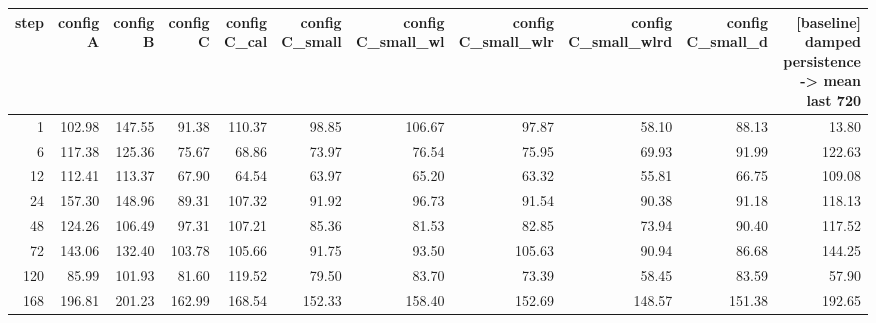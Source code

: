 \begin{tabular}{rrrrrrrrrrr}
\toprule
step & config A & config B & config C & config C\_cal & config C\_small & config C\_small\_wl & config C\_small\_wlr & config C\_small\_wlrd & config C\_small\_d & [baseline] damped persistence -> mean last 720 \\
\midrule
1 & 102.98 & 147.55 & 91.38 & 110.37 & 98.85 & 106.67 & 97.87 & 58.10 & 88.13 & 13.80 \\
6 & 117.38 & 125.36 & 75.67 & 68.86 & 73.97 & 76.54 & 75.95 & 69.93 & 91.99 & 122.63 \\
12 & 112.41 & 113.37 & 67.90 & 64.54 & 63.97 & 65.20 & 63.32 & 55.81 & 66.75 & 109.08 \\
24 & 157.30 & 148.96 & 89.31 & 107.32 & 91.92 & 96.73 & 91.54 & 90.38 & 91.18 & 118.13 \\
48 & 124.26 & 106.49 & 97.31 & 107.21 & 85.36 & 81.53 & 82.85 & 73.94 & 90.40 & 117.52 \\
72 & 143.06 & 132.40 & 103.78 & 105.66 & 91.75 & 93.50 & 105.63 & 90.94 & 86.68 & 144.25 \\
120 & 85.99 & 101.93 & 81.60 & 119.52 & 79.50 & 83.70 & 73.39 & 58.45 & 83.59 & 57.90 \\
168 & 196.81 & 201.23 & 162.99 & 168.54 & 152.33 & 158.40 & 152.69 & 148.57 & 151.38 & 192.65 \\
\bottomrule
\end{tabular}
